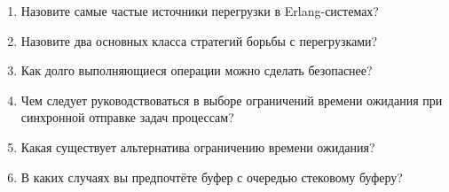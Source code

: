 \begin{enumerate}
	\item Назовите самые частые источники перегрузки в Erlang-системах?
	\item Назовите два основных класса стратегий борьбы с перегрузками?
	\item Как долго выполняющиеся операции можно сделать безопаснее?
	\item Чем следует руководствоваться в выборе ограничений времени ожидания при синхронной отправке задач процессам?
	\item Какая существует альтернатива ограничению времени ожидания?
	\item В каких случаях вы предпочтёте буфер с очередью стековому буферу?
\end{enumerate}

\subsection*{\OpenEndedTitle{}}


